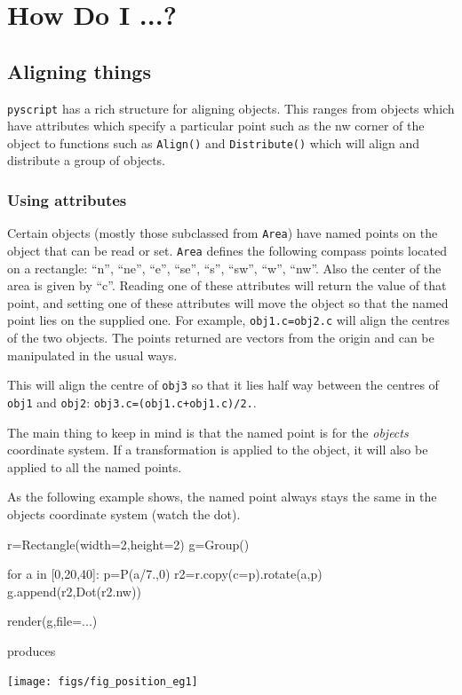 \documentclass[a4paper]{book}
\begin{document}
\chapter{How Do I ...?}
\label{cha:howto}

\section{Aligning things}

\Verb|pyscript| has a rich structure for aligning objects. This ranges
from objects which have attributes which specify a particular point
such as the nw corner of the object to functions such as
\Verb|Align()| and \Verb|Distribute()| which will align and distribute a 
group of objects.

\subsection{Using attributes}

Certain objects (mostly those subclassed from \Verb|Area|) have named points
on the object that can be read or set. \Verb|Area| defines the
following compass points located on a rectangle: ``n'', ``ne'',
``e'', ``se'', ``s'', ``sw'', ``w'', ``nw''. Also the center of the
area is given by ``c''. Reading one of these attributes will return
the value of that point, and setting one of
these attributes will move the object so that the named point lies
on the supplied one. For example, \Verb|obj1.c=obj2.c| will align the
centres of the two objects. The points returned are vectors from the origin 
and can be manipulated in the usual ways.
\begin{example}
  This will align the centre of \Verb|obj3| so that it lies half way
  between the centres of \Verb|obj1| and \Verb|obj2|:
  \Verb|obj3.c=(obj1.c+obj1.c)/2.|.
\end{example}

The main thing to keep in mind is that the named point is for the
\emph{objects} coordinate system. If a transformation is applied to
the object, it will also be applied to all the named points.
\begin{example}
  As the following example shows, the named point always stays the same 
  in the objects coordinate system (watch the dot).
\begin{python}
r=Rectangle(width=2,height=2)
g=Group()

for a in [0,20,40]:
    p=P(a/7.,0)
    r2=r.copy(c=p).rotate(a,p)
    g.append(r2,Dot(r2.nw))

render(g,file=...)
\end{python}
produces
\begin{center}
  \texttt{[image: figs/fig\_position\_eg1]}
\end{center}
\end{example}
\end{document}
